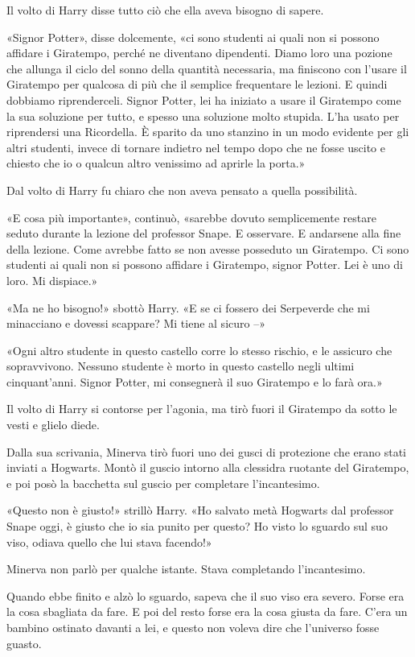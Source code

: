 Il volto di Harry disse tutto ciò che ella aveva bisogno di sapere.

«Signor Potter», disse dolcemente, «ci sono studenti ai quali non si possono affidare i Giratempo, perché ne diventano dipendenti. Diamo loro una pozione che allunga il ciclo del sonno della quantità necessaria, ma finiscono con l’usare il Giratempo per qualcosa di più che il semplice frequentare le lezioni. E quindi dobbiamo riprenderceli. Signor Potter, lei ha iniziato a usare il Giratempo come la sua soluzione per tutto, e spesso una soluzione molto stupida. L’ha usato per riprendersi una Ricordella. È sparito da uno stanzino in un modo evidente per gli altri studenti, invece di tornare indietro nel tempo dopo che ne fosse uscito e chiesto che io o qualcun altro venissimo ad aprirle la porta.»

Dal volto di Harry fu chiaro che non aveva pensato a quella possibilità.

«E cosa più importante», continuò, «sarebbe dovuto semplicemente restare seduto durante la lezione del professor Snape. E osservare. E andarsene alla fine della lezione. Come avrebbe fatto se non avesse posseduto un Giratempo. Ci sono studenti ai quali non si possono affidare i Giratempo, signor Potter. Lei è uno di loro. Mi dispiace.»

«Ma ne ho bisogno!» sbottò Harry. «E se ci fossero dei Serpeverde che mi minacciano e dovessi scappare? Mi tiene al sicuro –»

«Ogni altro studente in questo castello corre lo stesso rischio, e le assicuro che sopravvivono. Nessuno studente è morto in questo castello negli ultimi cinquant’anni. Signor Potter, mi consegnerà il suo Giratempo e lo farà ora.»

Il volto di Harry si contorse per l’agonia, ma tirò fuori il Giratempo da sotto le vesti e glielo diede.

Dalla sua scrivania, Minerva tirò fuori uno dei gusci di protezione che erano stati inviati a Hogwarts. Montò il guscio intorno alla clessidra ruotante del Giratempo, e poi posò la bacchetta sul guscio per completare l’incantesimo.

«Questo non è giusto!» strillò Harry. «Ho salvato metà Hogwarts dal professor Snape oggi, è giusto che io sia punito per questo? Ho visto lo sguardo sul suo viso, odiava quello che lui stava facendo!»

Minerva non parlò per qualche istante. Stava completando l’incantesimo.

Quando ebbe finito e alzò lo sguardo, sapeva che il suo viso era severo. Forse era la cosa sbagliata da fare. E poi del resto forse era la cosa giusta da fare. C’era un bambino ostinato davanti a lei, e questo non voleva dire che l’universo fosse guasto.

